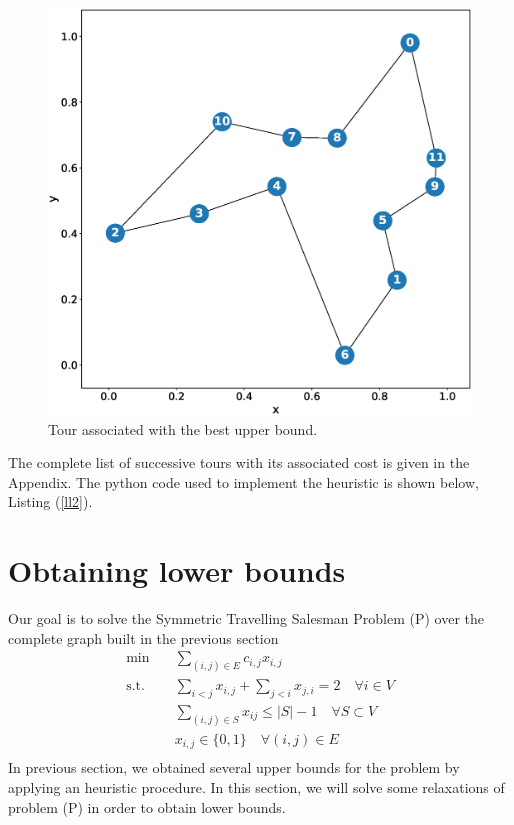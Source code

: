 \documentclass[12pt]{article}
\newenvironment{code}{\captionsetup{type=listing}}{}
\begin{document}
\begin{figure}[H]
\centering
    \includegraphics[width=0.7\linewidth]{f1.eps} 
  \caption{Tour associated with the best upper bound.}
  \label{f3}
\end{figure}

The complete list of successive tours with its associated cost is given in the Appendix. The python code used to implement the heuristic is shown below, Listing (\ref{ll2}).

\begin{code}
\label{ll2}
\end{code}

\section{Obtaining lower bounds}
Our goal is to solve the Symmetric Travelling Salesman Problem (P) over the complete graph built in the previous section
\begin{equation}
    \begin{aligned}
        \min \quad & \sum_{(i,j)\in E}c_{i,j}x_{i,j}\\
        \textrm{s.t.} \quad & \sum_{i<j}x_{i,j} + \sum_{j<i}x_{j,i} = 2 \quad \forall i \in V\\
        & \sum_{(i,j)\in S}x_{ij} \leq |S|-1 \quad \forall S \subset V\\
        & x_{i,j} \in \{0,1\} \quad \forall (i,j) \in E  \\
    \end{aligned}
    \tag{P}\label{opt-P}
\end{equation}
In previous section, we obtained several upper bounds for the problem by applying an heuristic procedure. In this section, we will solve some relaxations of problem (P) in order to obtain lower bounds.\\
\end{document}
